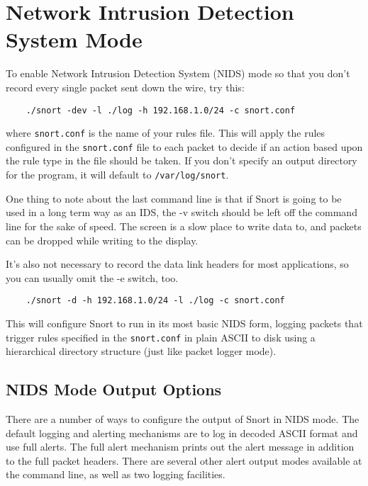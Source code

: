 \documentclass[english]{report}
\begin{document}
\section{Network Intrusion Detection System Mode}

To enable Network Intrusion Detection System (NIDS) mode so that you don't
record every single packet sent down the wire, try this:

\begin{verbatim}
    ./snort -dev -l ./log -h 192.168.1.0/24 -c snort.conf
\end{verbatim}

where \texttt{snort.conf} is the name of your rules file. This will apply the
rules configured in the \verb!snort.conf! file to each packet to decide if an
action based upon the rule type in the file should be taken. If you don't
specify an output directory for the program, it will default to
\verb!/var/log/snort!.

One thing to note about the last command line is that if Snort is going to be
used in a long term way as an IDS, the -v switch should be left off the command
line for the sake of speed.  The screen is a slow place to write data to, and
packets can be dropped while writing to the display.

It's also not necessary to record the data link headers for most applications,
so you can usually omit the -e switch, too.

\begin{verbatim}
    ./snort -d -h 192.168.1.0/24 -l ./log -c snort.conf
\end{verbatim}

This will configure Snort to run in its most basic NIDS form, logging packets
that trigger rules specified in the \texttt{snort.conf} in plain ASCII to disk
using a hierarchical directory structure (just like packet logger mode). 


\subsection{NIDS Mode Output Options}

There are a number of ways to configure the output of Snort in NIDS mode. The
default logging and alerting mechanisms are to log in decoded ASCII format and
use full alerts. The full alert mechanism prints out the alert message in
addition to the full packet headers. There are several other alert output modes
available at the command line, as well as two logging facilities.
\end{document}
